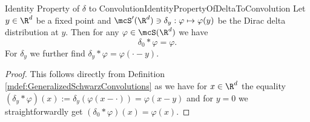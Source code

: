 \begin{mcor}{Identity Property of $\delta$ to Convolution}{IdentityPropertyOfDeltaToConvolution}
    Let $y\in\R^d$ be a fixed point and $\mcS'(\R^d)\ni\delta_y:\varphi\mapsto\varphi(y)$ be the Dirac delta distribution at $y$. Then for any $\varphi\in\mcS(\R^d)$ we have
    \[
        \delta_0\ast\varphi = \varphi.
    \]
    For $\delta_y$ we further find $\delta_y\ast\varphi = \varphi(\cdot -y)$.
\end{mcor}
\begin{proof}
    This follows directly from Definition \ref{mdef:GeneralizedSchwarzConvolutions} as we have for $x\in\R^d$ the equality $(\delta_y\ast\varphi)(x) := \delta_y(\varphi(x - \cdot)) = \varphi(x - y)$ and for $y = 0$ we straightforwardly get $(\delta_0\ast\varphi)(x) = \varphi(x)$.
\end{proof}
